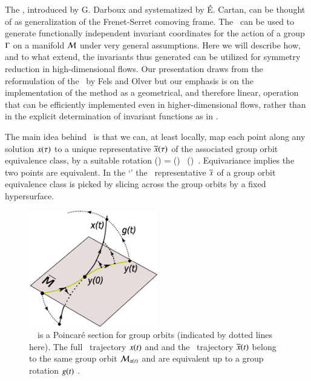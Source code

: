 
The \mframes, introduced by G. Darboux and systematized by \'E. Cartan,
can be thought of as generalization of the Frenet-Serret comoving frame.
The \mframes\ can be used to generate functionally independent invariant coordinates
for the action of a group $\Gamma$ on a manifold ${\cal M}$ under
very general assumptions.  Here we will describe how, and to what extend,
the invariants thus generated can be utilized for symmetry reduction in
high-dimensional flows. Our presentation draws from the reformulation of the \mframes\
by Fels and Olver but our emphasis is on the implementation
of the method as a geometrical, and therefore linear, operation that can be efficiently
implemented even in higher-dimensional flows, rather than in the explicit
determination of invariant functions as in .

The main idea behind \mframes\ is that we can, at least locally,
map each point along any solution $x(\tau)$ to a unique
representative $\overline{x}(\tau)$ of the associated
group orbit equivalence class, by a suitable rotation
\beq
\ssp(\tau) = \LieEl(\tau) \, \sspRed(\tau)
\,.
Equivariance implies the two points are equivalent.
In the `\mframes' the \reducedsp\ representative $\overline{x}$
of a group orbit equivalence class is picked by slicing across the group orbits
by a fixed hypersurface.
%
\begin{figure}[ht]
\begin{center}
 \includegraphics[width=0.5\textwidth]{../Fig/ReducTraj1}
\end{center}
\label{fig:ReducTraj}
\caption{
\Slice\ \pSRed\ is a Poincar\'e section  for
group orbits (indicated by dotted lines here). The full
\statesp\ trajectory $x(t)$ and and the \reducedsp\
trajectory $\overline{x}(t)$ belong to the same group orbit
${\cal M}_{x(t)}$ and are equivalent up to a group rotation
$g(t)$ \refeq{EquiTraj}.
}
\end{figure}
%

